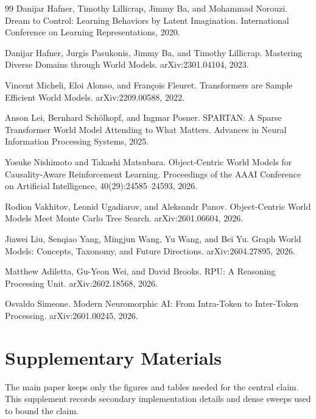 \documentclass[11pt]{article}
\begin{document}
\begin{thebibliography}{99}
Danijar Hafner, Timothy Lillicrap, Jimmy Ba, and Mohammad Norouzi.
\newblock Dream to Control: Learning Behaviors by Latent Imagination.
\newblock International Conference on Learning Representations, 2020.

Danijar Hafner, Jurgis Pasukonis, Jimmy Ba, and Timothy Lillicrap.
\newblock Mastering Diverse Domains through World Models.
\newblock arXiv:2301.04104, 2023.

Vincent Micheli, Eloi Alonso, and Fran{\c c}ois Fleuret.
\newblock Transformers are Sample Efficient World Models.
\newblock arXiv:2209.00588, 2022.

Anson Lei, Bernhard Sch{\"o}lkopf, and Ingmar Posner.
\newblock SPARTAN: A Sparse Transformer World Model Attending to What Matters.
\newblock Advances in Neural Information Processing Systems, 2025.

Yosuke Nishimoto and Takashi Matsubara.
\newblock Object-Centric World Models for Causality-Aware Reinforcement
Learning.
\newblock Proceedings of the AAAI Conference on Artificial Intelligence,
40(29):24585--24593, 2026.

Rodion Vakhitov, Leonid Ugadiarov, and Aleksandr Panov.
\newblock Object-Centric World Models Meet Monte Carlo Tree Search.
\newblock arXiv:2601.06604, 2026.

Jiawei Liu, Senqiao Yang, Mingjun Wang, Yu Wang, and Bei Yu.
\newblock Graph World Models: Concepts, Taxonomy, and Future Directions.
\newblock arXiv:2604.27895, 2026.

Matthew Adiletta, Gu-Yeon Wei, and David Brooks.
\newblock RPU: A Reasoning Processing Unit.
\newblock arXiv:2602.18568, 2026.

Osvaldo Simeone.
\newblock Modern Neuromorphic AI: From Intra-Token to Inter-Token Processing.
\newblock arXiv:2601.00245, 2026.

\end{thebibliography}

\appendix
\section{Supplementary Materials}

The main paper keeps only the figures and tables needed for the central claim.
This supplement records secondary implementation details and dense sweeps used
to bound the claim.
\end{document}
